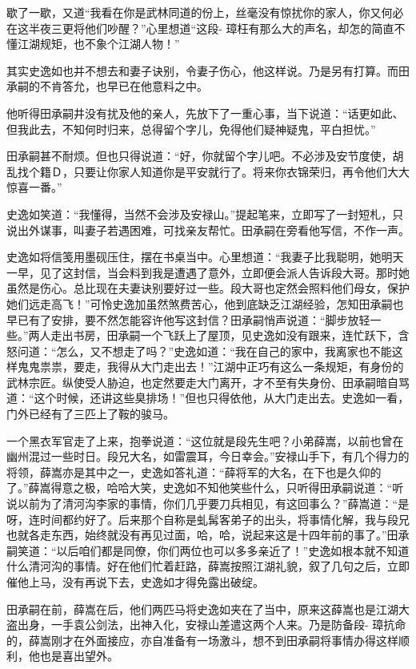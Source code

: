 \documentclass[12pt,oneside]{book}
\begin{document}
歇了一歇，又道``我看在你是武林同道的份上，丝毫没有惊扰你的家人，你又何必在这半夜三更将他们吵醒？''心里想道``这段-
璋枉有那么大的声名，却怎的简直不懂江湖规矩，也不象个江湖人物！''

其实史逸如也并不想去和妻子诀别，令妻子伤心，他这样说。乃是另有打算。而田承嗣的不肯答允，也早已在他意料之中。

他听得田承嗣井没有扰及他的亲人，先放下了一重心事，当下说道：``话更如此、但我此去，不知何时归来，总得留个字儿，免得他们疑神疑鬼，平白担忧。''

田承嗣甚不耐烦。但也只得说道：``好，你就留个字儿吧。不必涉及安节度使，胡乱找个籍Ｄ，只要让你家人知道你是平安就行了。将来你衣锦荣归，再令他们大大惊喜一番。''

史逸如笑道：``我懂得，当然不会涉及安禄山。''提起笔来，立即写了一封短札，只说出外谋事，叫妻子若遇困难，可找亲友帮忙。田承嗣在旁看他写信，不作一声。

史逸如将信笺用墨砚压住，摆在书桌当中。心里想道：``我妻子比我聪明，她明天一早，见了这封信，当会料到我是遭遇了意外，立即便会派人告诉段大哥。那时她虽然是伤心。总比现在夫妻诀别要好过一些。段大哥也定然会照料他们母女，保护她们远走高飞！''可怜史逸加虽然煞费苦心，他到底缺乏江湖经验，怎知田承嗣也早已有了安排，要不然怎能容许他写这封信？田承嗣悄声说道：``脚步放轻一些。''两人走出书房，田承嗣一个飞跃上了屋顶，见史逸如没有跟来，连忙跃下，含怒问道：``怎么，又不想走了吗？''史逸如道：``我在自己的家中，我离家也不能这样鬼鬼祟祟，要走，我得从大门走出去！''江湖中正巧有这么一条规矩，有身份的武林宗匠。纵使受人胁迫，也定然要走大门离开，才不至有失身份、田承嗣暗自骂道：``这个时候，还讲这些臭排场！''但也只得依他，从大门走出去。史逸如一看，门外已经有了三匹上了鞍的骏马。

一个黑衣军官走了上来，抱拳说道：``这位就是段先生吧？小弟薛嵩，以前也曾在幽州混过一些时日。段兄大名，如雷震耳，今日幸会。''安禄山手下，有几个得力的将领，薛嵩亦是其中之一，史逸如答礼道：``薛将军的大名，在下也是久仰的了。''薛嵩得意之极，哈哈大笑，史逸如不知他笑些什么，只听得田承嗣说道：``听说以前为了清河沟李家的事情，你们几乎要刀兵相见，有这回事么？''薛嵩道：``是呀，连时间都约好了。后来那个自称是虬髯客弟子的出头，将事情化解，我与段兄也就各走东西，始终就没有再见过面，哈，哈，说起来这是十四年前的事了。''田承嗣笑道：``以后咱们都是同僚，你们两位也可以多多亲近了！''史逸如根本就不知道什么清河沟的事情。好在他们忙着赶路，薛嵩按照江湖礼貌，叙了几句之后，立即催他上马，没有再说下去，史逸如才得免露出破绽。

田承嗣在前，薛嵩在后，他们两匹马将史逸如夹在了当中，原来这薛嵩也是江湖大盗出身，一手袁公剑法，出神入化，安禄山差遣这两个人来。乃是防备段-
璋抗命的，薛嵩刚才在外面接应，亦自准备有一场激斗，想不到田承嗣将事情办得这样顺利，他也是喜出望外。
\end{document}
